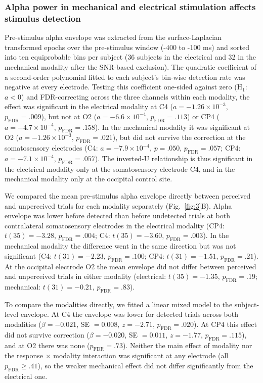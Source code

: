 \documentclass[11pt,a4paper,onecolumn]{article}
\begin{document}
\subsubsection*{Alpha power in mechanical and electrical stimulation affects stimulus detection}
\vspace{-7pt}
Pre-stimulus alpha envelope was extracted from the surface-Laplacian transformed epochs over the pre-stimulus window (-400 to -100 ms) and sorted into ten equiprobable bins per subject (36 subjects in the electrical and 32 in the mechanical modality after the SNR-based exclusion). The quadratic coefficient of a second-order polynomial fitted to each subject's bin-wise detection rate was negative at every electrode. Testing this coefficient one-sided against zero (H$_1$: $a < 0$) and FDR-correcting across the three channels within each modality, the effect was significant in the electrical modality at C4 ($a = -1.26 \times 10^{-3}$, $p_\mathrm{FDR} = .009$), but not at O2 ($a = -6.6 \times 10^{-4}$, $p_\mathrm{FDR} = .113$) or CP4 ($a = -4.7 \times 10^{-4}$, $p_\mathrm{FDR} = .158$). In the mechanical modality it was significant at O2 ($a = -1.26 \times 10^{-3}$, $p_\mathrm{FDR} = .021$), but did not survive the correction at the somatosensory electrodes (C4: $a = -7.9 \times 10^{-4}$, $p = .050$, $p_\mathrm{FDR} = .057$; CP4: $a = -7.1 \times 10^{-4}$, $p_\mathrm{FDR} = .057$). The inverted-U relationship is thus significant in the electrical modality only at the somatosensory electrode C4, and in the mechanical modality only at the occipital control site.

We compared the mean pre-stimulus alpha envelope directly between perceived and unperceived trials for each modality separately (Fig.~\ref{fig:3}B). Alpha envelope was lower before detected than before undetected trials at both contralateral somatosensory electrodes in the electrical modality (CP4: $t(35) = -3.28$, $p_\mathrm{FDR} = .004$; C4: $t(35) = -3.60$, $p_\mathrm{FDR} = .003$). In the mechanical modality the difference went in the same direction but was not significant (C4: $t(31) = -2.23$, $p_\mathrm{FDR} = .100$; CP4: $t(31) = -1.51$, $p_\mathrm{FDR} = .21$). At the occipital electrode O2 the mean envelope did not differ between perceived and unperceived trials in either modality (electrical: $t(35) = -1.35$, $p_\mathrm{FDR} = .19$; mechanical: $t(31) = -0.21$, $p_\mathrm{FDR} = .83$). 

To compare the modalities directly, we fitted a linear mixed model to the subject-level envelope. At C4 the envelope was lower for detected trials across both modalities ($\beta = -0.021$, SE $= 0.008$, $z = -2.71$, $p_\mathrm{FDR} = .020$). At CP4 this effect did not survive correction ($\beta = -0.020$, SE $= 0.011$, $z = -1.77$, $p_\mathrm{FDR} = .115$), and at O2 there was none ($p_\mathrm{FDR} = .73$). Neither the main effect of modality nor the response $\times$ modality interaction was significant at any electrode (all $p_\mathrm{FDR} \geq .41$), so the weaker mechanical effect did not differ significantly from the electrical one.
\end{document}
